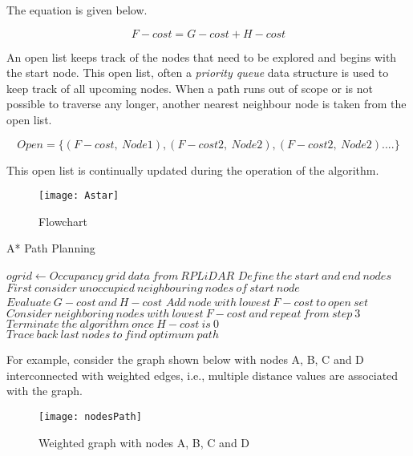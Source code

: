 The equation is given below.

\[F-cost = G-cost + H-cost\]

An open list keeps track of the nodes that need to be explored and begins with the start node. This open list, often a \emph{priority queue} data structure is used to keep track of all upcoming nodes. When a path runs out of scope or is not possible to traverse any longer, another nearest neighbour node is taken from the open list.

\[Open = \{(F-cost, \ Node1),(F-cost2, \ Node2), (F-cost2, \ Node2) .... \}\]

This open list is continually updated during the operation of the algorithm.

\newpage
\begin{figure}
    \centering
    \texttt{[image: Astar]}
    \caption{Flowchart}
    \label{fig:pathPlanningFlowchart}
\end{figure}

\vspace{2cm}
\begin{algorithm}[hbt!]
    \caption{A* Path Planning}
    \label{alg:AStarAlgorithm}
    
    \begin{algorithmic}[1]
    
        \Require $ogrid \gets Occupancy \ grid \ data \ from \ RPLiDAR$
        \State $Define \ the \ start \ and \ end\ nodes$
        \State $First \ consider \ unoccupied \ neighbouring \ nodes \ of \ start \ node$
        \State $Evaluate \ G-cost \ and \ H-cost$
        \State $Add \ node \ with \ lowest \ F-cost \ to \ open \ set$
        \State $Consider \ neighboring \ nodes \ with \ lowest \ F-cost \ and \ repeat \ from \ step \ 3 $
        \State $Terminate \ the \ algorithm \ once \ H-cost \ is \ 0 $
        \State $Trace \ back \ last \ nodes\ to \ find \ optimum \ path$
        
    \end{algorithmic}
\end{algorithm}

For example, consider the graph shown below with nodes A, B, C and D interconnected with weighted edges, i.e., multiple distance values are associated with the graph.

\begin{figure}
    \centering
    \texttt{[image: nodesPath]}
    \caption{Weighted graph with nodes A, B, C and D}
    \label{fig:weightedGraph}
\end{figure}

